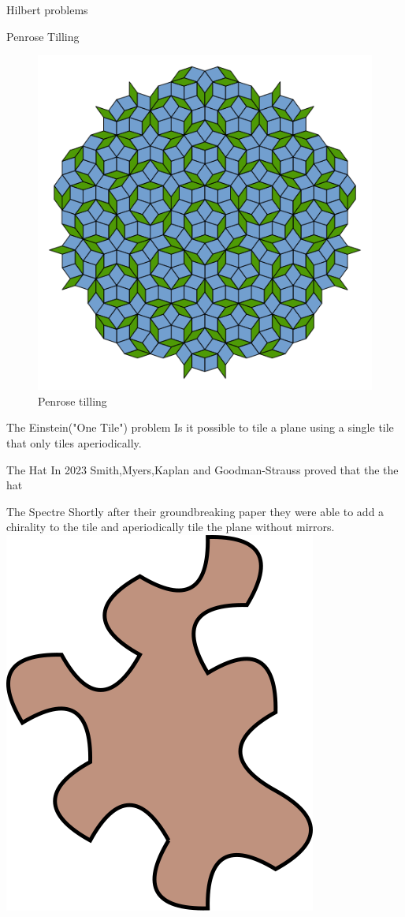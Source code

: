 \documentclass{beamer}
\theoremstyle{definition}
\begin{document}
\begin{frame}{Hilbert problems}
    
\end{frame}

\begin{frame}{Penrose Tilling}
    \begin{figure}
        \centering
        \includegraphics[width=0.5\linewidth]{images/Penrose_Tiling_(Rhombi).svg.png}
        \caption{Penrose tilling}
        \label{fig:penrose-rhombi}
    \end{figure}
\end{frame}

\begin{frame}{The Einstein("One Tile") problem}
    Is it possible to tile a plane using a single tile that only tiles aperiodically.
\end{frame}

\begin{frame}{The Hat}
    In 2023 Smith,Myers,Kaplan and Goodman-Strauss proved that the the hat
\end{frame}

\begin{frame}{The Spectre}
    Shortly after their groundbreaking paper they were able to add a chirality to the tile and aperiodically tile the plane without mirrors.
    \includegraphics[width=0.3\linewidth]{images/Spectre_aperiodic_monotile_single.svg.png}
\end{frame}
\end{document}
